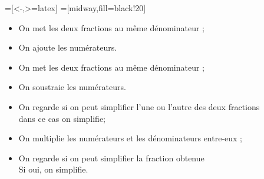 \ifdefined\COMPLETE
\else
    
    
\fi

                 
                 
=[<-,>=latex]   
=[midway,fill=black!20]        
      
\begin{flushright}
\end{flushright}

\vspace*{-2.5cm}
\renewcommand{\labelitemi}{\textbullet}
    
\begin{itemize}
\item On met les deux fractions au même dénominateur ;
\item On ajoute les numérateurs.
\end{itemize}

\bigskip   

\begin{itemize}
\item On met les deux fractions au même dénominateur ;
\item On soustraie les numérateurs.
\end{itemize}

\bigskip   

\begin{itemize}
\item On regarde si on peut simplifier l'une ou l'autre des deux fractions\\
      dans ce cas on simplifie;
\item On multiplie les numérateurs et les dénominateurs entre-eux ; 
\item On regarde si on peut simplifier la fraction obtenue\\
      Si oui, on simplifie.
\end{itemize}

\bigskip   


